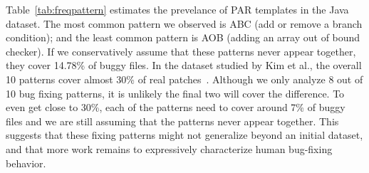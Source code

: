 \documentclass{sig-alternate-05-2015}
\begin{document}
Table~\ref{tab:freqpattern} estimates the prevelance of PAR templates in the
Java dataset. The most common pattern we observed is ABC (add or remove a branch condition); and the least common
pattern is AOB (adding an array out of bound checker). If we conservatively assume that these patterns never appear together, they
cover 14.78\% of buggy files. In the dataset studied by Kim et al., the overall
10 patterns cover almost 30\% of real patches~\cite{kim2013}. Although we only analyze 8
out of 10 bug fixing patterns, it is unlikely the final two will cover the
difference. To even get close to 30\%, each of the patterns need to cover around 7\% of buggy files and we are still assuming that the patterns never appear together. 
This suggests that these fixing patterns might not generalize
beyond an initial dataset, and that more work remains to expressively characterize human bug-fixing behavior.
\end{document}
